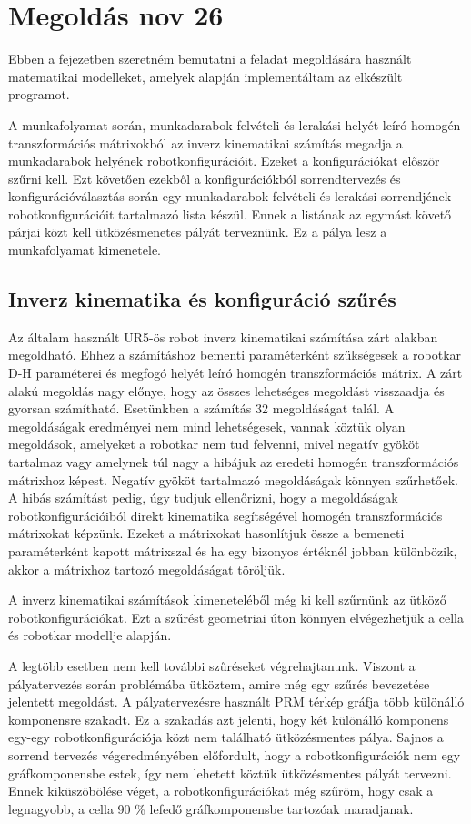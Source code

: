 \chapter{Megoldás nov 26}
Ebben a fejezetben szeretném bemutatni a feladat megoldására használt matematikai modelleket, amelyek alapján implementáltam az elkészült programot.

A munkafolyamat során, munkadarabok felvételi és lerakási helyét leíró homogén transzformációs mátrixokból az inverz kinematikai számítás megadja a munkadarabok helyének robotkonfigurációit. Ezeket a konfigurációkat először szűrni kell. Ezt követően ezekből a konfigurációkból sorrendtervezés és konfigurációválasztás során egy munkadarabok felvételi és lerakási sorrendjének robotkonfigurációit tartalmazó lista készül. Ennek a listának az egymást követő párjai közt kell ütközésmenetes pályát terveznünk. Ez a pálya lesz a munkafolyamat kimenetele. 

\section{Inverz kinematika és konfiguráció szűrés}
Az általam használt UR5-ös robot inverz kinematikai számítása zárt alakban megoldható. Ehhez a számításhoz bementi paraméterként szükségesek a robotkar D-H paraméterei és megfogó helyét leíró homogén transzformációs mátrix. A zárt alakú megoldás nagy előnye, hogy az összes lehetséges megoldást visszaadja és gyorsan számítható. Esetünkben a számítás 32 megoldáságat talál. A megoldáságak eredményei nem mind lehetségesek, vannak köztük olyan megoldások, amelyeket a robotkar nem tud felvenni, mivel negatív gyököt tartalmaz vagy amelynek túl nagy a hibájuk az eredeti homogén transzformációs mátrixhoz képest. Negatív gyököt tartalmazó megoldáságak könnyen szűrhetőek. A hibás számítást pedig, úgy tudjuk ellenőrizni, hogy a megoldáságak robotkonfigurációiból direkt kinematika segítségével homogén transzformációs mátrixokat képzünk. Ezeket a mátrixokat hasonlítjuk össze a bemeneti paraméterként kapott mátrixszal és ha egy bizonyos értéknél jobban különbözik, akkor a mátrixhoz tartozó megoldáságat töröljük.

A inverz kinematikai számítások kimeneteléből még ki kell szűrnünk az ütköző robotkonfigurációkat. Ezt a szűrést geometriai úton könnyen elvégezhetjük a cella és robotkar modellje alapján.

A legtöbb esetben nem kell további szűréseket végrehajtanunk. Viszont a pályatervezés során problémába ütköztem, amire még egy szűrés bevezetése jelentett megoldást. A pályatervezésre használt PRM térkép gráfja több különálló komponensre szakadt. Ez a szakadás azt jelenti, hogy két különálló komponens egy-egy robotkonfigurációja közt nem található ütközésmentes pálya. Sajnos a sorrend tervezés végeredményében előfordult, hogy a robotkonfigurációk nem egy gráfkomponensbe estek, így nem lehetett köztük ütközésmentes pályát tervezni. Ennek kiküszöbölése véget, a robotkonfigurációkat még szűröm, hogy csak a legnagyobb, a cella 90 \% lefedő gráfkomponensbe tartozóak maradjanak.

